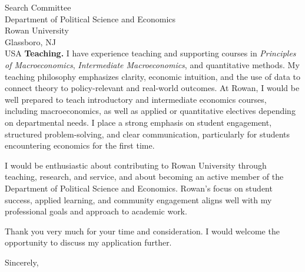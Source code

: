 \documentclass[11pt,letterpaper]{letter}
\begin{document}
\begin{letter}{Search Committee \\
Department of Political Science and Economics \\
Rowan University \\
Glassboro, NJ \\ USA}
\textbf{Teaching.} I have experience teaching and supporting courses in \textit{Principles of Macroeconomics}, \textit{Intermediate Macroeconomics}, and quantitative methods. My teaching philosophy emphasizes clarity, economic intuition, and the use of data to connect theory to policy-relevant and real-world outcomes. At Rowan, I would be well prepared to teach introductory and intermediate economics courses, including macroeconomics, as well as applied or quantitative electives depending on departmental needs. I place a strong emphasis on student engagement, structured problem-solving, and clear communication, particularly for students encountering economics for the first time.

I would be enthusiastic about contributing to Rowan University through teaching, research, and service, and about becoming an active member of the Department of Political Science and Economics. Rowan’s focus on student success, applied learning, and community engagement aligns well with my professional goals and approach to academic work.

Thank you very much for your time and consideration. I would welcome the opportunity to discuss my application further.

\closing{Sincerely,}

\end{letter}
\end{document}
